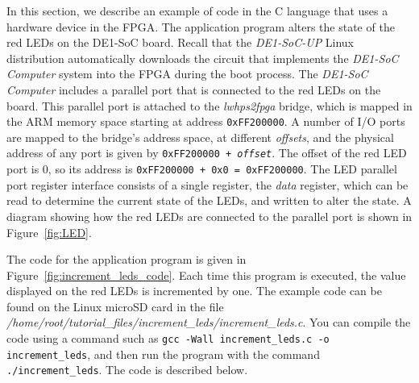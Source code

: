 \documentclass[11pt, twoside, pdftex]{article}
\begin{document}
In this section, we describe an example of code in the C language that uses a hardware
device in the FPGA. The application program alters the state of the red LEDs on 
the DE1-SoC board. 
Recall that the \textit{DE1-SoC-UP} Linux distribution automatically downloads the
circuit that implements the \textit{DE1-SoC Computer} system into the FPGA 
during the boot process. The \textit{DE1-SoC Computer} 
includes a parallel port that is connected to the red LEDs on the board. This parallel port 
is attached to the \textit{lwhps2fpga} bridge, which is mapped in the ARM memory space starting 
at address \texttt{0xFF200000}. A number of I/O ports are mapped to the bridge's
address space, at different {\it offsets}, and the 
physical address of any port is given by \texttt{0xFF200000 + {\it offset}}. The offset
of the red LED port is 0, so its address is \texttt{0xFF200000 + 0x0 = 0xFF200000}.
The LED parallel port register interface consists of a single register, the \textit{data} 
register, which can be read to determine the current state of the LEDs, and written to 
alter the state. A diagram showing how the red LEDs are connected to the parallel port is shown 
in Figure~\ref{fig:LED}.

The code for the application program is given in Figure~\ref{fig:increment_leds_code}.
Each time this program is executed, the value displayed on the red LEDs
is incremented by one. The example code can be found on the Linux microSD card in the file
\textit{/home/root/tutorial\_files/increment\_leds/increment\_leds.c}. You can 
compile the code using a command such as \texttt{gcc -Wall increment\_leds.c -o
increment\_leds}, and then run the program with the command \texttt{./increment\_leds}.
The code is described below. 
\end{document}
